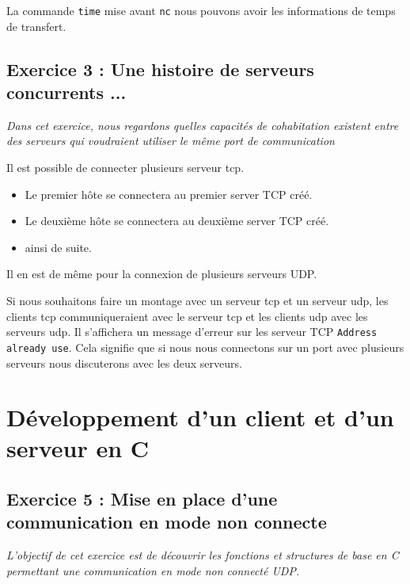 La commande \texttt{time} mise avant \texttt{nc} nous pouvons avoir les informations de temps de transfert.

\subsection{Exercice 3 : Une histoire de serveurs concurrents ...}
\textit{Dans cet exercice, nous regardons quelles capacités de cohabitation existent entre des serveurs qui voudraient utiliser le même port de communication}

Il est possible de connecter plusieurs serveur tcp.
\begin{itemize}
  \item Le premier hôte se connectera au premier server TCP créé.
  \item Le deuxième hôte se connectera au deuxième server TCP créé.
  \item ainsi de suite.
\end{itemize}
Il en est de même pour la connexion de plusieurs serveurs UDP.

Si nous souhaitons faire un montage avec un serveur tcp et un serveur udp, les clients tcp communiqueraient avec le serveur tcp et les clients udp avec les serveurs udp.
Il s'affichera un message d'erreur sur les serveur TCP \texttt{Address already use}. Cela signifie que si nous nous connectons sur un port avec plusieurs serveurs nous discuterons avec les deux serveurs.


\section{Développement d’un client et d’un serveur en C}
\subsection{Exercice 5 : Mise en place d’une communication en mode non connecte}
\textit{L’objectif de cet exercice est de découvrir les fonctions et structures de base en C permettant une communication en mode non connecté UDP.}

